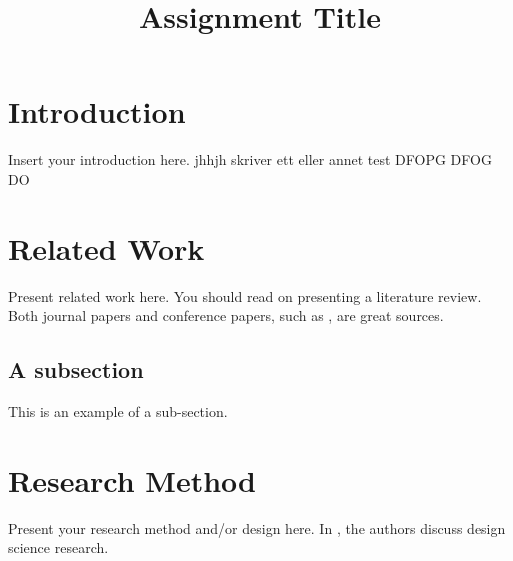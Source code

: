 \documentclass[fleqn,10pt]{wlscirep}
\title{Assignment Title}
\author{}
\begin{document}





\flushbottom
\maketitle


\section{Introduction}
Insert your introduction here. jhhjh
skriver ett eller annet
test
DFOPG DFOG DO

\section{Related Work}
Present related work here. 
You should read \cite{Webster2002-pw} on presenting a literature review.
Both journal papers and conference papers, such as \cite{Dingsoyr2014-xt}, are great sources.

\subsection{A subsection}
This is an example of a sub-section.

\section{Research Method}
Present your research method and/or design here. 
In \cite{Hevner2010-yw}, the authors discuss design science research.
\end{document}
